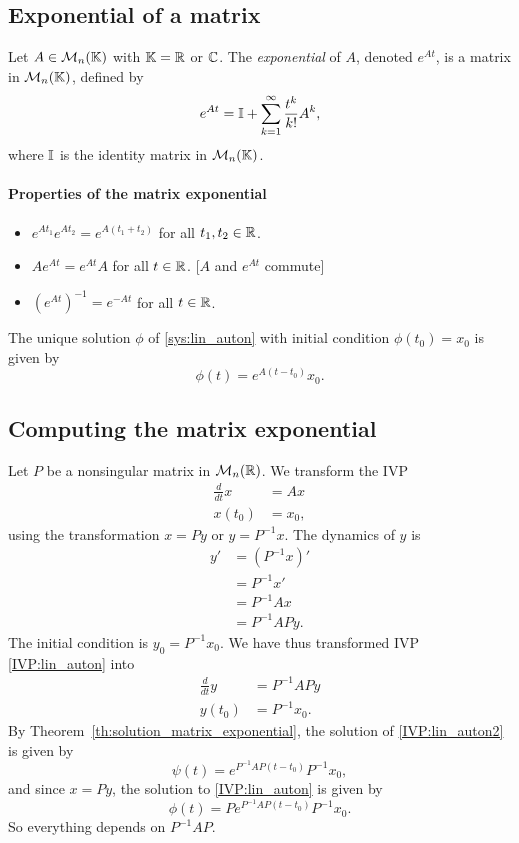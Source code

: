 \subsection{Exponential of a matrix}
\begin{definition}
Let $A\in\mathcal{M}_n(\mathbb{K})$ with $\mathbb{K}=\mathbb{R}$ or $\mathbb{C}$. The \emph{exponential} of $A$, denoted $e^{At}$, is a matrix in $\mathcal{M}_n(\mathbb{K})$, defined by
\[
e^{At}=\mathbb{I} +\sum_{k=1}^\infty \frac{t^k}{k!}A^k,
\]
where $\mathbb{I}$ is the identity matrix in $\mathcal{M}_n(\mathbb{K})$.
\end{definition}

\paragraph{Properties of the matrix exponential}
\begin{itemize}
\item $e^{At_1}e^{At_2}=e^{A(t_1+t_2)}$ for all $t_1,t_2\in\mathbb{R}$.
\item $Ae^{At}=e^{At}A$ for all $t\in\mathbb{R}$. [$A$ and $e^{At}$ commute]
\item $(e^{At})^{-1}=e^{-At}$ for all $t\in\mathbb{R}$.
\end{itemize}
\begin{theorem}\label{th:solution_matrix_exponential}
The unique solution $\phi$ of \eqref{sys:lin_auton} with initial condition $\phi(t_0)=x_0$ is given by
\[
\phi(t)=e^{A(t-t_0)}x_0.
\]
\end{theorem}


\subsection{Computing the matrix exponential}
Let $P$ be a nonsingular matrix in $\mathcal{M}_n(\mathbb{R})$. We transform the IVP
\begin{equation}\label{IVP:lin_auton}
\begin{aligned}
\frac{d}{dt}x &= Ax\\
x(t_0)&=x_0,
\end{aligned}
\end{equation}
using the transformation $x=Py$ or $y=P^{-1}x$.
The dynamics of $y$ is
\begin{align*}
y' &= (P^{-1}x)' \\
&= P^{-1}x' \\
&= P^{-1}Ax \\
&= P^{-1}APy.
\end{align*}
The initial condition is $y_0=P^{-1}x_0$.
We have thus transformed IVP \eqref{IVP:lin_auton} into
\begin{equation}\label{IVP:lin_auton2}
\begin{aligned}
\frac{d}{dt}y &= P^{-1}APy\\
y(t_0)&=P^{-1}x_0.
\end{aligned}
\end{equation}
By Theorem~\ref{th:solution_matrix_exponential}, the solution of \eqref{IVP:lin_auton2} is given by
\[
\psi(t)=e^{P^{-1}AP(t-t_0)}P^{-1}x_0,
\]
and since $x=Py$, the solution to \eqref{IVP:lin_auton} is given by
\[
\phi(t)=Pe^{P^{-1}AP(t-t_0)}P^{-1}x_0.
\]
So everything depends on $P^{-1}AP$.



